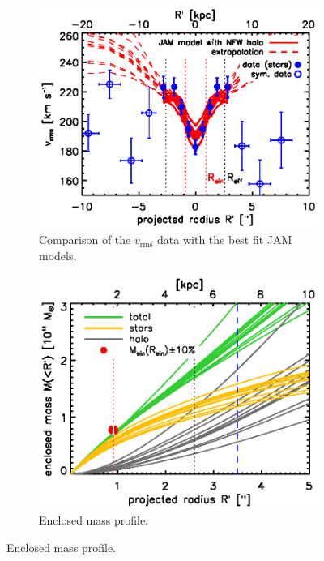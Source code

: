 \begin{figure}
\centering
\begin{subfigure}{.48\textwidth}
  \centering
  \includegraphics[width=0.9\linewidth]{fig/B4_rms_error_curves.ps}
  \caption{Comparison of the $v_\text{rms}$ data with the best fit JAM models.}
  \label{fig:modelB4_vrms}
\end{subfigure}%
\hspace{.02\textwidth}
\begin{subfigure}{.48\textwidth}
  \centering
  \includegraphics[width=0.9\linewidth]{fig/B4_jam_profiles_errors_short_projmass.ps}
  \caption{Enclosed mass profile.}
  \label{fig:modelB4_enclMass}
\end{subfigure}

\end{figure}
